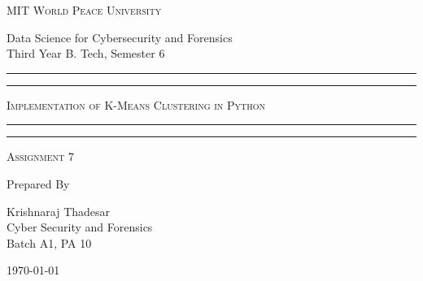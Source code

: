 \documentclass[11pt]{article}
\begin{document}
\begin{titlepage}
    \centering


    \huge\textsc{
        MIT World Peace University
    }\\

    \vspace{0.75\baselineskip} %

    \LARGE{
        Data Science for Cybersecurity and Forensics\\
        Third Year B. Tech, Semester 6
    }

    \vfill %


    \rule{\textwidth}{1.6pt}\vspace*{-\baselineskip}\vspace*{2pt}
    \rule{\textwidth}{0.6pt}
    \vspace{0.75\baselineskip} %



    \huge{\textsc{
            Implementation of K-Means Clustering in Python
        }} \\



    \vspace{0.5\baselineskip} %
    \rule{\textwidth}{0.6pt}\vspace*{-\baselineskip}\vspace*{2.8pt}
    \rule{\textwidth}{1.6pt}

    \vspace{1\baselineskip} %


    \LARGE\textsc{
        Assignment 7
    } %
    \vfill


    Prepared By
    \vspace{0.5\baselineskip} %

    \Large{
        Krishnaraj Thadesar \\
        Cyber Security and Forensics\\
        Batch A1, PA 10
    }


    \vspace{0.5\baselineskip} %
    \today

\end{titlepage}
\end{document}
